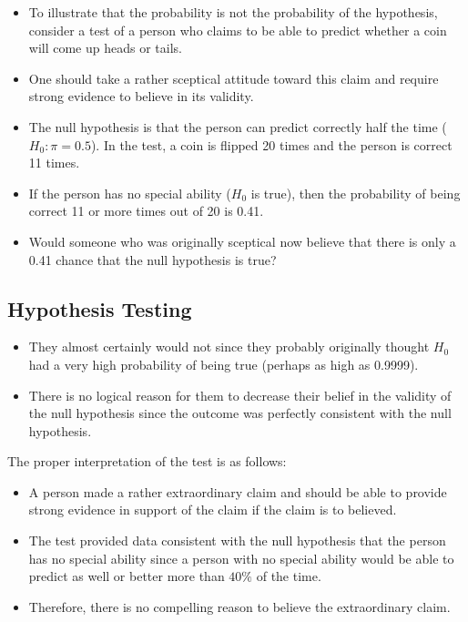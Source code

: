 \documentclass[]{report}
\begin{document}
{{{\begin{itemize}
\item To illustrate that the probability is not the probability of the hypothesis, consider a test of a person who claims to be able to predict whether a coin will come up heads or tails. \item One should take a rather sceptical attitude toward this claim and require strong evidence to believe in its validity. 
\end{itemize}



\begin{itemize}
\item The null hypothesis is that the person can predict correctly half the time ($H_0: \pi = 0.5$). In the test, a coin is flipped 20 times and the person is correct 11 times. \item If the person has no special ability ($H_0$ is true), then the probability of being correct 11 or more times out of 20 is 0.41.\item  Would someone who was originally sceptical now believe that there is only a 0.41 chance that the null hypothesis is true? 
\end{itemize}


\subsection{Hypothesis Testing}
\begin{itemize}
\item They almost certainly would not since they probably originally thought $H_0$ had a very high probability of being true (perhaps as high as 0.9999). \item There is no logical reason for them to decrease their belief in the validity of the null hypothesis since the outcome was perfectly consistent with the null hypothesis. \end{itemize}

\begin{framed}

The proper interpretation of the test is as follows:

\begin{itemize} \item  A person made a rather extraordinary claim and should be able to provide strong evidence in support of the claim if the claim is to believed. \item The test provided data consistent with the null hypothesis that the person has no special ability since a person with no special ability would be able to predict as well or better more than $40\%$ of the time. \item Therefore, there is no compelling reason to believe the extraordinary claim. \end{itemize} 
\end{framed}








}}}
\end{document}
